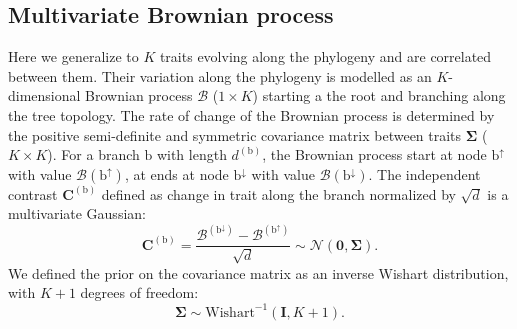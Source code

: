 \documentclass{article}
\newcommand{\UniDimArray}[1]{\bm{#1}}
\newcommand{\BiDimArray}[1]{\bm{#1}}
\newcommand{\branch}{\text{b}}
\newcommand{\branchexp}{^{(\branch)}}
\newcommand{\nodeUp}{\branch^{\uparrow}}
\newcommand{\nodeDown}{\branch^{\downarrow}}
\newcommand{\Ntrait}{K}
\newcommand{\contrast}{\UniDimArray{C}}
\newcommand{\Covariancematrix}{\Sigma}
\newcommand{\CovarianceMatrix}{\BiDimArray{\Covariancematrix}}
\newcommand{\Identitymatrix}{\BiDimArray{I}}
\newcommand{\brownian}{\mathcal{B}}
\newcommand{\Brownian}{\UniDimArray{\brownian}}
\newcommand{\vecZero}{\UniDimArray{0}}
\begin{document}
\subsection{Multivariate Brownian process}
Here we generalize to $\Ntrait$  traits evolving along the phylogeny and are correlated between them.
Their variation along the phylogeny is modelled as an $\Ntrait$-dimensional Brownian process $\Brownian$ ($1 \times \Ntrait$) starting a the root and branching along the tree topology.
The rate of change of the Brownian process is determined by the positive semi-definite and symmetric covariance matrix between traits $\CovarianceMatrix$ ($\Ntrait \times \Ntrait$).
For a branch $\branch$ with length $d\branchexp$, the Brownian process start at node $\nodeUp$ with value $\Brownian(\nodeUp)$, at ends at node $\nodeDown$ with value $\Brownian(\nodeDown)$.
The independent contrast $\contrast\branchexp$ defined as change in trait along the branch normalized by $\sqrt {d}$ is a multivariate Gaussian:
\begin{equation}
    \label{eq:DistribBrownian}
    \contrast\branchexp = \frac{\Brownian^{(\nodeDown)} - \Brownian^{(\nodeUp)} }{\sqrt {d}} \sim \mathcal{N}\left(\vecZero, \CovarianceMatrix \right).
\end{equation}
We defined the {prior} on the covariance matrix as an inverse Wishart distribution, with $\Ntrait + 1$ degrees of freedom:
\begin{equation}
    \label{eq:Distribcovariance}
    \CovarianceMatrix \sim \text{Wishart}^{-1} (\Identitymatrix, \Ntrait + 1).
\end{equation}
\end{document}
